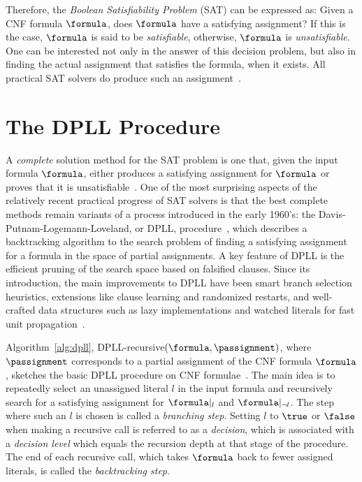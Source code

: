 Therefore, the \emph{Boolean Satisfiability Problem} (SAT) can be expressed as:
Given a CNF formula $\formula$, does $\formula$ have a satisfying assignment? If
this is the case, $\formula$ is said to be \emph{satisfiable}, otherwise,
$\formula$ is \emph{unsatisfiable}.  One can be interested not only in the
answer of this decision problem, but also in finding the actual assignment that
satisfies the formula, when it exists. All practical SAT solvers do produce such
an assignment~\cite{cormen}. 

\section{The DPLL Procedure}%
\label{sec:dpll}

A \emph{complete} solution method for the SAT problem is one that, given the
input formula $\formula$, either produces a satisfying assignment for $\formula$
or proves that it is unsatisfiable~\cite{satchapter}. One of the most surprising
aspects of the relatively recent practical progress of SAT solvers is that the
best complete methods remain variants of a process introduced in the early
1960’s: the Davis-Putnam-Logemann-Loveland, or DPLL,
procedure~\cite{DavisLongemannLoveland:1962}, which describes a backtracking
algorithm to the search problem of finding a satisfying assignment for a formula in
the space of partial assignments. A key feature of DPLL is the efficient pruning of
the search space based on falsified clauses. Since its introduction, the main
improvements to DPLL have been smart branch selection heuristics, extensions
like clause learning and randomized restarts, and well-crafted data structures
such as lazy implementations and watched literals for fast unit
propagation~\cite{satchapter}.

Algorithm~\ref{alg:dpll}, DPLL-recursive$(\formula, \passignment)$, where
$\passignment$ corresponds to a partial assignment of the CNF formula
$\formula$, sketches the basic DPLL procedure on CNF
formulae~\cite{DavisLongemannLoveland:1962}. The main idea is to repeatedly
select an unassigned literal $l$ in the input formula and recursively search for
a satisfying assignment for $\formula|_l$ and $\formula|_{\neg l}$. The step
where such an $l$ is chosen is called a \emph{branching step}. Setting $l$ to
$\true$ or $\false$ when making a recursive call is referred to as a
\emph{decision}, which is associated with a \emph{decision level} which equals the
recursion depth at that stage of the procedure. The end of each recursive call,
which takes $\formula$ back to fewer assigned literals, is called the
\emph{backtracking step}.

